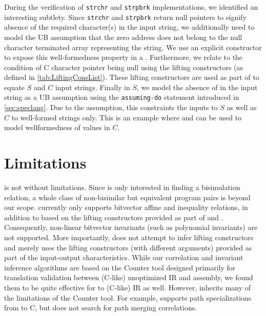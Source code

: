 During the verification of {\tt strchr} and {\tt strpbrk} implementations,
we identified an interesting subtlety. Since {\tt strchr} and {\tt strpbrk}
return null pointers to signify absence of the required character(s) in the input string,
we additionally need to model the UB assumption that the zero
address does not belong to the null character terminated array representing the string.
We use an explicit constructor  to expose this well-formedness property in a \SpecL{} .
Furthermore, we relate  to the condition of C character pointer being null using the
lifting constructors  (as defined in \cref{tab:LiftingConsList}).
These lifting constructors are used as part of \pre{} to equate $S$ and $C$ input strings.
Finally in $S$, we model the absence of  in the input string as a UB assumption using
the {\tt assuming-do} statement introduced in \cref{sec:speclang}.
Due to the \sdef{} assumption, this constraints the inputs to $S$ as well as $C$ to well-formed strings only.
This is an example where \sdef{} and \pre{} can be used to model wellformedness of values in $C$.

\section{Limitations}
\label{sec:limitations}
\toolName{} is not without limitations.
Since \toolName{} is only interested in finding a bisimulation relation,
a whole class of non-bisimilar but equivalent program pairs is beyond our scope.
\toolName{} currently only supports bitvector affine and inequality relations, in addition to \recursiveRelations{}
based on the lifting constructors provided as part of \pre{} and \post{}.
Consequently, non-linear bitvector invariants (such as polynomial invariants) are not supported.
More importantly, \toolName{} does not attempt to infer lifting constructors and merely
uses the lifting constructors (with different arguments) provided as part of the input-output characteristics.
While our correlation and invariant inference algorithms are based on the Counter tool \cite{oopsla20}
designed primarily for translation validation between (C-like) unoptimized IR and assembly, we found them to be
quite effective for \SpecL{} to (C-like) IR as well.
However, \toolName{} inherits many of the limitations of the Counter tool.
For example, \toolName{} supports path specializations from \SpecL{} to C, but does not
search for path merging correlations.


